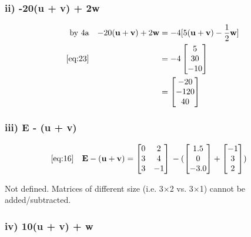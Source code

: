 \documentclass{article}
\begin{document}
\subsubsection*{ii) -20(\textbf{u} + \textbf{v}) + 2\textbf{w}}

\begin{align}
    \label{eq:24}
    \text{by 4a} && -20(\textbf{u} + \textbf{v}) + 2\textbf{w} &= -4[5(\textbf{u} + \textbf{v}) -\frac{1}{2}\textbf{w}]
    \\
    \label{eq:25}
    \eqref{eq:23} && &= -4\begin{bmatrix}
    5 \\ 30 \\ -10
    \end{bmatrix}
    \\
    \label{eq:26}
    && &= \begin{bmatrix}
    -20\\-120\\40
    \end{bmatrix}
\end{align}

\subsubsection*{iii) \textbf{E} - (\textbf{u} + \textbf{v})}

\begin{align}
    \label{eq:27}
    \eqref{eq:16} && \textbf{E} - (\textbf{u} + \textbf{v}) &= \begin{bmatrix} 0 & 2\\ 3 & 4\\ 3 & -1 \end{bmatrix}{} - (\begin{bmatrix} 1.5\\ 0\\ -3.0 \end{bmatrix} + \begin{bmatrix} -1\\ 3\\ 2 \end{bmatrix})
\end{align}
\par \hspace{15mm} Not defined. Matrices of different size (i.e. 3$\times$2 vs. 3$\times$1) cannot be added/subtracted.

\subsubsection*{iv) 10(\textbf{u} + \textbf{v}) + \textbf{w}}
\end{document}
